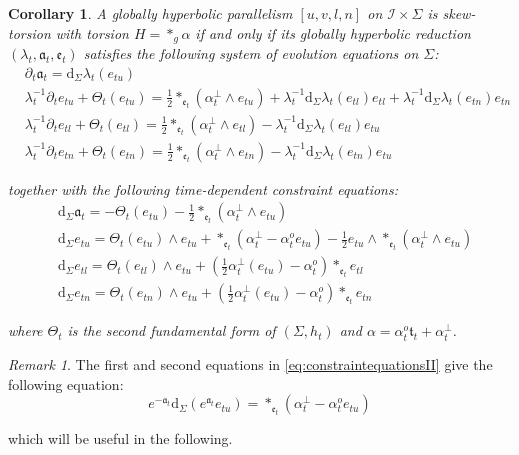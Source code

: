 \documentclass[10pt,reqno,a4paper]{amsart}
\theoremstyle{plain}
\newtheorem{cor}[thm]{Corollary}
\theoremstyle{definition}
\theoremstyle{remark}
\newtheorem{remark}[thm]{Remark}
\theoremstyle{remark}
\newcommand{\frt}{\mathfrak{t}}
\def\dd{\mathrm{d}}
\def\cI{\mathcal{I}}
\def\fra{\mathfrak{a}}
\def\fre{\mathfrak{e}}
\renewcommand{\(}{ (}
\renewcommand{\)}{ )}
\begin{document}
\begin{cor}
\label{cor:Thetaevolutionsystem}
A globally hyperbolic parallelism $[u,v,l,n]$ on $\cI\times \Sigma$ is skew-torsion with torsion $H =  \ast_g\alpha$ if and only if its globally hyperbolic reduction $(\lambda_t,\fra_t,\fre_t)$ satisfies the following system of evolution equations on $\Sigma$:
\begin{eqnarray}
& \partial_t \fra_t =  \dd_{\Sigma} \lambda_t( e_{tu}) \nonumber \\
&  \lambda_t^{-1} \partial_t e_{tu} + \Theta_t(e_{tu}) = \frac{1}{2}\ast_{\fre_t} (\alpha^{\perp}_t \wedge e_{tu}) +   \lambda_t^{-1} \dd_{\Sigma} \lambda_t (e_{tl}) e_{tl} + \lambda_t^{-1} \dd_{\Sigma} \lambda_t (e_{tn}) e_{tn} \nonumber \\
& \lambda_t^{-1} \partial_t e_{tl} + \Theta_t(e_{tl})  = \frac{1}{2} \ast_{\fre_t} (\alpha^{\perp}_t \wedge e_{tl}) -  \lambda_t^{-1} \dd_{\Sigma} \lambda_t (e_{tl}) e_{tu}   \label{eq:evolutionequationsII} \\
& \lambda_t^{-1} \partial_t e_{tn} + \Theta_t(e_{tn}) = \frac{1}{2} \ast_{\fre_t} (\alpha^{\perp}_t\wedge e_{tn})  -  \lambda_t^{-1} \dd_{\Sigma} \lambda_t (e_{tn}) e_{tu}   \nonumber
\end{eqnarray}

\noindent
together with the following time-dependent constraint equations:
\begin{eqnarray}
&  \dd_{\Sigma} \fra_t   =  - \Theta_t (e_{tu}) - \frac{1}{2}  \ast_{\fre_t} (\alpha^{\perp}_t \wedge e_{tu})  \nonumber \\
& \dd_{\Sigma} e_{tu} = \Theta_t(e_{tu})\wedge e_{tu} + \ast_{\fre_t} (\alpha^{\perp}_t   - \alpha^o_t e_{tu}) - \frac{1}{2} e_{tu} \wedge \ast_{\fre_t} (\alpha^{\perp}_t \wedge e_{tu}) \nonumber \\
& \dd_{\Sigma} e_{tl} = \Theta_t(e_{tl})\wedge e_{tu} +  (\frac{1}{2}\alpha^{\perp}_t (e_{tu}) - \alpha^o_t) \ast_{\fre_t} e_{tl} \label{eq:constraintequationsII} \\
& \dd_{\Sigma} e_{tn} = \Theta_t(e_{tn})\wedge e_{tu} +  (\frac{1}{2} \alpha^{\perp}_t (e_{tu}) - \alpha^o_t) \ast_{\fre_t} e_{tn} \nonumber
\end{eqnarray}

\noindent
where $\Theta_t$ is the second fundamental form of $(\Sigma,h_t)$ and $\alpha = \alpha^o_t \frt_t + \alpha^{\perp}_t$. 
\end{cor}

\begin{remark}
The first and second equations in \eqref{eq:constraintequationsII} give the following equation:
\begin{equation*}
e^{-\fra_t}\dd_{\Sigma} (e^{\fra_t} e_{tu}) =  \ast_{\fre_t} (\alpha^{\perp}_t   - \alpha^o_t e_{tu})
\end{equation*}

\noindent
which will be useful in the following. 
\end{remark}
\end{document}
